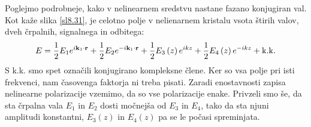 \documentclass[11pt,fleqn]{book} %
\begin{document}
Poglejmo podrobneje, kako v nelinearnem sredstvu nastane fazano konjugiran
val. Kot kaže slika \ref{sl8.31}, je celotno polje v nelienarnem
kristalu vsota štirih valov, dveh črpalnih, signalnega in odbitega:
\begin{equation}
E=\frac{1}{2}E_{1}e^{i{\bf k}_{1}\cdot{\bf r}}+\frac{1}{2}E_{2}e^{-i{\bf k}_{1}\cdot{\bf r}}+\frac{1}{2}E_{3}\left(z\right)e^{ikz}+\frac{1}{2}E_{4}\left(z\right)e^{-ikz}+{\rm k.k.}\label{8.99}
\end{equation}
 S k.k. smo spet označili konjugirano kompleksne člene. Ker so vsa
polje pri isti frekvenci, nam časovenga faktorja ni treba pisati.
Zaradi enostavnosti zapisa nelinearne polarizacije vzemimo, da so
vse polarizacije enake. Privzeli smo še, da sta črpalna vala $E_{1}$
in $E_{2}$ dosti močnejša od $E_{3}$ in $E_{4}$, tako da sta njuni
amplitudi konstantni, $E_{3}\left(z\right)$ in $E_{4}\left(z\right)$
pa se le počasi spreminjata.
\end{document}
